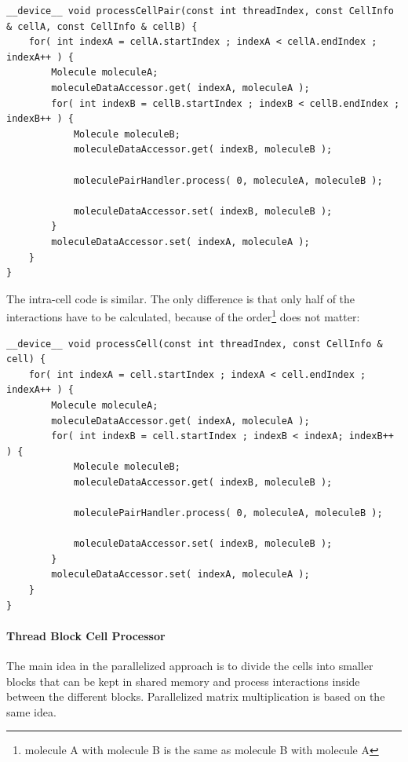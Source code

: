 \begin{lstlisting}[label=intercellreferenceloop,caption=Reference Inter-Cell Block Processing]
__device__ void processCellPair(const int threadIndex, const CellInfo & cellA, const CellInfo & cellB) {
	for( int indexA = cellA.startIndex ; indexA < cellA.endIndex ; indexA++ ) {
		Molecule moleculeA;
		moleculeDataAccessor.get( indexA, moleculeA );
		for( int indexB = cellB.startIndex ; indexB < cellB.endIndex ; indexB++ ) {
			Molecule moleculeB;
			moleculeDataAccessor.get( indexB, moleculeB );

			moleculePairHandler.process( 0, moleculeA, moleculeB );

			moleculeDataAccessor.set( indexB, moleculeB );
		}
		moleculeDataAccessor.set( indexA, moleculeA );
	}
}
\end{lstlisting}
The intra-cell code is similar. The only difference is that only half of the interactions have to be calculated, because of the order\footnote{molecule A with molecule B is the same as molecule B with molecule A} does not matter:
\begin{lstlisting}[label=intracellreferenceloop,caption=Reference Intra-Cell Block Processing]
__device__ void processCell(const int threadIndex, const CellInfo & cell) {
	for( int indexA = cell.startIndex ; indexA < cell.endIndex ; indexA++ ) {
		Molecule moleculeA;
		moleculeDataAccessor.get( indexA, moleculeA );
		for( int indexB = cell.startIndex ; indexB < indexA; indexB++ ) {
			Molecule moleculeB;
			moleculeDataAccessor.get( indexB, moleculeB );

			moleculePairHandler.process( 0, moleculeA, moleculeB );

			moleculeDataAccessor.set( indexB, moleculeB );
		}
		moleculeDataAccessor.set( indexA, moleculeA );
	}
}
\end{lstlisting}

\paragraph{Thread Block Cell Processor}
The main idea in the parallelized approach is to divide the cells into smaller blocks that can be kept in shared memory and process interactions inside between the different blocks. Parallelized matrix multiplication is based on the same idea. 

